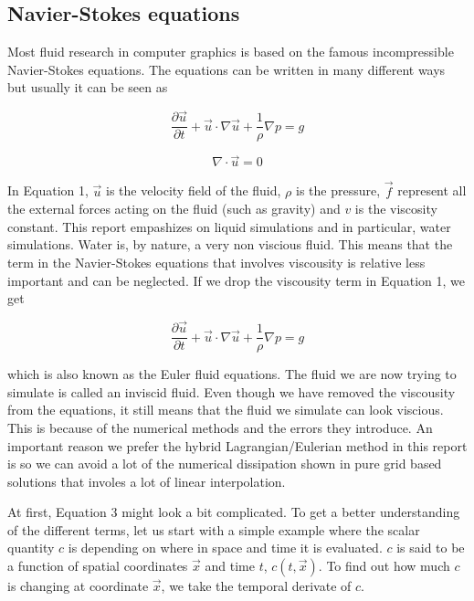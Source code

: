 \subsection{Navier-Stokes equations}

Most fluid research in computer graphics is based on the famous incompressible Navier-Stokes equations. The equations can be written in many different ways but usually it can be seen as

\begin{equation}
\frac{\partial \vec{u}}{\partial t} + \vec{u} \cdot \nabla \vec{u} + \frac{1}{\rho}\nabla p = g
\end{equation}

\begin{equation}
\nabla \cdot \vec{u} = 0
\end {equation}

In Equation 1, $\vec{u}$ is the velocity field of the fluid, $\rho$ is the pressure, $\vec{f}$ represent all the external forces acting on the fluid (such as gravity) and $v$ is the viscosity constant. This report empashizes on liquid simulations and in particular, water simulations. Water is, by nature, a very non viscious fluid. This means that the term in the Navier-Stokes equations that involves viscousity is relative less important and can be neglected. If we drop the viscousity term in Equation 1, we get

\begin{equation}
\frac{\partial \vec{u}}{\partial t} + \vec{u} \cdot \nabla \vec{u} + \frac{1}{\rho}\nabla p = g
\end{equation}

which is also known as the Euler fluid equations. The fluid we are now trying to simulate is called an inviscid fluid. Even though we have removed the viscousity from the equations, it still means that the fluid we simulate can look viscious. This is because of the numerical methods and the errors they introduce. An important reason we prefer the hybrid Lagrangian/Eulerian method in this report is so we can avoid a lot of the numerical dissipation shown in pure grid based solutions that involes a lot of linear interpolation. 
\newline

At first, Equation 3 might look a bit complicated. To get a better understanding of the different terms, let us start with a simple example where the scalar quantity $c$ is depending on where in space and time it is evaluated. $c$ is said to be a function of spatial coordinates $\vec{x}$ and time $t$, $c(t,\vec{x})$. To find out how much $c$ is changing at coordinate $\vec{x}$, we take the temporal derivate of $c$.

